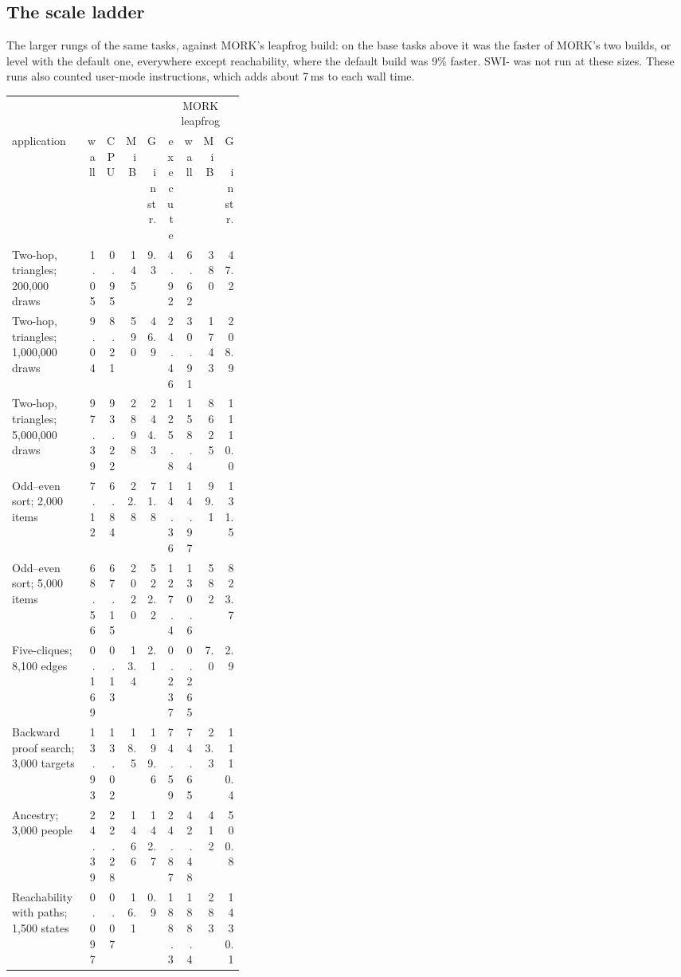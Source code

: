 \subsection{The scale ladder}
\label{app:runtimes-scale}

The larger rungs of the same tasks, against MORK's leapfrog build: on the base
tasks above it was the faster of MORK's two builds, or level with the default
one, everywhere except reachability, where the default build was 9\% faster.
SWI-\PeTTa{} was not run at these sizes.  These runs also counted user-mode
instructions, which adds about 7\,ms to each wall time.

\begin{center}
\small
\setlength{\tabcolsep}{3.5pt}
\begin{tabular}{@{}p{0.34\linewidth}rrrrrrrr@{}}
\toprule
 & \multicolumn{4}{c}{\CeTTa{}} & \multicolumn{4}{c}{MORK leapfrog} \\
\cmidrule(lr){2-5}\cmidrule(lr){6-9}
application & wall & CPU & MiB & G\,instr. & execute & wall & MiB & G\,instr. \\
\midrule
Two-hop, triangles; 200,000 draws & 1.05 & 0.95 & 145 & 9.3 & 4.92 & 6.62 & 380 & 47.2 \\
Two-hop, triangles; 1,000,000 draws & 9.04 & 8.21 & 590 & 46.9 & 24.46 & 30.91 & 1743 & 208.9 \\
Two-hop, triangles; 5,000,000 draws & 97.39 & 93.22 & 2898 & 244.3 & 125.8 & 158.4 & 8625 & 1110.0 \\
Odd--even sort; 2,000 items & 7.12 & 6.84 & 22.8 & 71.8 & 14.36 & 14.97 & 99.1 & 131.5 \\
Odd--even sort; 5,000 items & 68.56 & 67.15 & 2020 & 522.2 & 127.4 & 130.6 & 582 & 823.7 \\
Five-cliques; 8,100 edges & 0.169 & 0.13 & 13.4 & 2.1 & 0.237 & 0.265 & 7.0 & 2.9 \\
Backward proof search; 3,000 targets & 13.93 & 13.02 & 18.5 & 199.6 & 74.59 & 74.65 & 23.3 & 1110.4 \\
Ancestry; 3,000 people & 24.39 & 22.28 & 1466 & 142.7 & 24.87 & 42.48 & 412 & 500.8 \\
Reachability with paths; 1,500 states & 0.097 & 0.07 & 16.1 & 0.9 & 188.3 & 188.4 & 283 & 1430.1 \\
\bottomrule
\end{tabular}
\end{center}

